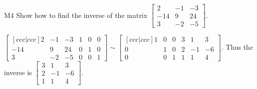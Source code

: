 \begin{problem}{M4}
  Show how to find the inverse of the matrix
  \(\begin{bmatrix}
    2 & -1 & -3  \\
    -14 & 9 & 24  \\
    3 & -2 & -5
  \end{bmatrix}\).
\end{problem}
\begin{solution}
  \(\begin{bmatrix}[ccc|ccc]
    2 & -1 & -3 & 1 & 0 & 0 \\
    -14 & 9 & 24 & 0 & 1 & 0 \\
    3 & -2 & -5 & 0 & 0 & 1
  \end{bmatrix}\sim\begin{bmatrix}[ccc|ccc]
    1 & 0 & 0 & 3 & 1 & 3  \\
    0 & 1 & 0 & 2 & -1 & -6  \\
    0 & 0 & 1 & 1 & 1 & 4
  \end{bmatrix}\). Thus the inverse is
  \(\begin{bmatrix}
    3 & 1 & 3  \\
    2 & -1 & -6  \\
    1 & 1 & 4
  \end{bmatrix}\).
\end{solution}
